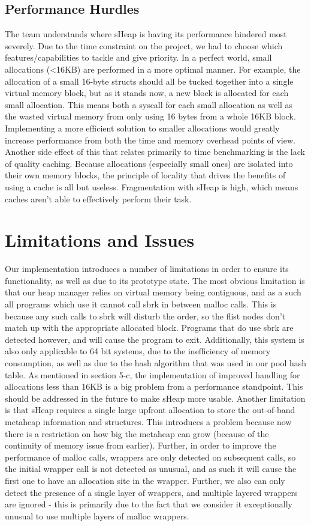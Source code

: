 \documentclass[conference]{IEEEtran}
\begin{document}
\subsection{Performance Hurdles}
The team understands where sHeap is having its performance hindered most severely. Due to 
the time constraint on the project, we had to choose which features/capabilities to tackle 
and give priority. In a perfect world, small allocations (<16KB) are performed in a more 
optimal manner. For example, the allocation of a small 16-byte structs should all be tucked 
together into a single virtual memory block, but as it stands now, a new block is allocated 
for each small allocation. This means both a syscall for each small allocation as well as 
the wasted virtual memory from only using 16 bytes from a whole 16KB block. Implementing a 
more efficient solution to smaller allocations would greatly increase performance from both 
the time and memory overhead points of view. Another side effect of this that relates 
primarily to time benchmarking is the lack of quality caching. Because allocations (especially 
small ones) are isolated into their own memory blocks, the principle of locality that drives 
the benefits of using a cache is all but useless. Fragmentation with sHeap is high, which means 
caches aren’t able to effectively perform their task.

\section{Limitations and Issues}
Our implementation introduces a number of limitations in order to ensure its functionality, as 
well as due to its prototype state. The most obvious limitation is that our heap manager 
relies on virtual memory being contiguous, and as a such all programs which use it cannot call 
sbrk in between malloc calls. This is because any such calls to sbrk will disturb the order, 
so the flist nodes don’t match up with the appropriate allocated block. Programs that do use 
sbrk are detected however, and will cause the program to exit. Additionally, this system is 
also only applicable to 64 bit systems, due to the inefficiency of memory consumption, as well 
as due to the hash algorithm that was used in our pool hash table. As mentioned in section 5-c, 
the implementation of improved handling for allocations less than 16KB is a big problem from a 
performance standpoint. This should be addressed in the future to make sHeap more usable. 
Another limitation is that sHeap requires a single large upfront allocation to store the 
out-of-band metaheap information and structures. This introduces a problem because now there is 
a restriction on how big the metaheap can grow (because of the continuity of memory issue from 
earlier). Further, in order to improve the performance of malloc calls, wrappers are only 
detected on subsequent calls, so the initial wrapper call is not detected as unusual, and as 
such it will cause the first one to have an allocation site in the wrapper. Further, we also 
can only detect the presence of a single layer of wrappers, and multiple layered wrappers are 
ignored - this is primarily due to the fact that we consider it exceptionally unusual to use 
multiple layers of malloc wrappers.
\end{document}
